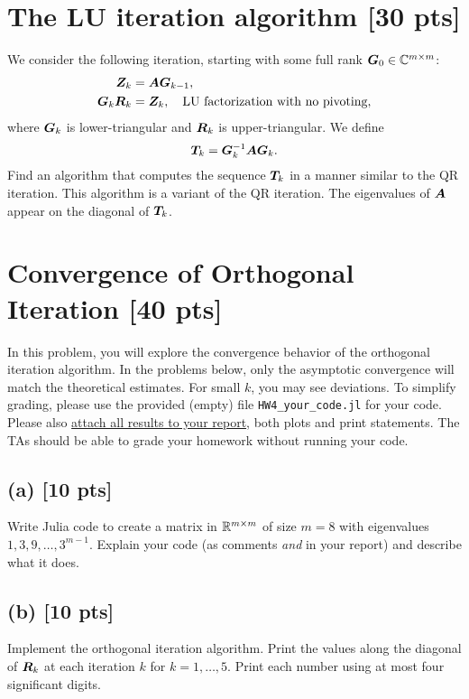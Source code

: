 \documentclass[twoside,10pt]{article}
\begin{document}
\section{The LU iteration algorithm [30 pts]} 
We consider the following iteration, starting with some full rank $\bm{G}_0 \in \mathbb{C}^{m \times m}$:
\begin{align}
  \bm{Z}_k &= \bm{A} \bm{G}_{k - 1}, \\
  \bm{G}_{k} \bm{R}_{k} &= \bm{Z}_k, \quad \text{LU factorization with no pivoting}, 
\end{align}
where $\bm{G}_k$ is lower-triangular and $\bm{R}_{k}$ is upper-triangular.
We define 
\begin{equation}
  \bm{T}_k = \bm{G}_{k}^{-1} \bm{A} \bm{G}_k.
\end{equation}
Find an algorithm that computes the sequence $\bm{T}_{k}$ in a manner similar to the QR iteration. 
This algorithm is a variant of the QR iteration. The eigenvalues of $\bm{A}$ appear on the diagonal of $\bm{T}_k$.



\section{Convergence of Orthogonal Iteration [40 pts]}
  In this problem, you will explore the convergence behavior of the orthogonal iteration algorithm. In the problems below, only the asymptotic convergence will match the theoretical estimates. 
  For small $k$, you may see deviations. 
  To simplify grading, please use the provided (empty) file \texttt{HW4\_your\_code.jl} for your code. 
  Please also \underline{attach all results to your report}, both plots and print statements. 
  The TAs should be able to grade your homework without running your code. 
  \subsection*{(a) [10 pts]} 
    Write Julia code to create a matrix in $\mathbb{R}^{m \times m}$ of size $m = 8$ with eigenvalues $1, 3, 9, \ldots, 3^{m -1}$. 
    Explain your code (as comments \emph{and} in your report) and describe what it does.

  \subsection*{(b) [10 pts]}
    Implement the orthogonal iteration algorithm. Print the values along the diagonal of $\bm{R}_{k}$ at each iteration $k$ for $k = 1, \ldots,5$. Print each number using at most four significant digits. 
  
\end{document}

